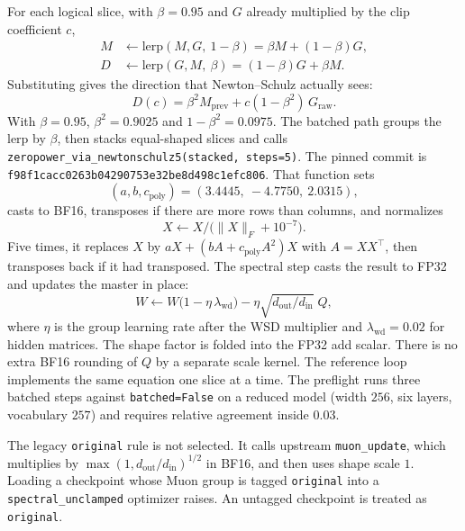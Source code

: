\documentclass[11pt]{article}
\DeclareRobustCommand{\code}[1]{\texttt{#1}}
\begin{document}
For each logical slice, with \(\beta=0.95\) and \(G\) already multiplied by
the clip coefficient \(c\),
\begin{align*}
M &\leftarrow \mathrm{lerp}(M, G,\ 1-\beta) = \beta M + (1-\beta)G,\\
D &\leftarrow \mathrm{lerp}(G, M,\ \beta) = (1-\beta)G + \beta M.
\end{align*}
Substituting gives the direction that Newton--Schulz actually sees:
\begin{equation}
\label{eq:nesterov}
D(c) = \beta^{2} M_{\mathrm{prev}} + c(1-\beta^{2})\,G_{\mathrm{raw}}.
\end{equation}
With \(\beta=0.95\), \(\beta^{2}=0.9025\) and \(1-\beta^{2}=0.0975\). The
batched path groups the lerp by \(\beta\), then stacks equal-shaped slices
and calls \code{zeropower\_via\_newtonschulz5(stacked, steps=5)}. The pinned
commit is \code{f98f1cacc0263b04290753e32be8d498c1efc806}. That function sets
\begin{equation}
(a,b,c_{\mathrm{poly}})=(3.4445,\ -4.7750,\ 2.0315),
\end{equation}
casts to BF16, transposes if there are more rows than columns, and normalizes
\begin{equation}
\label{eq:nsnorm}
X \leftarrow X / \big(\|X\|_F + 10^{-7}\big).
\end{equation}
Five times, it replaces \(X\) by \(aX + (bA+c_{\mathrm{poly}}A^{2})X\) with
\(A=XX^{\top}\), then transposes back if it had transposed. The spectral step
casts the result to FP32 and updates the master in place:
\begin{equation}
\label{eq:spectral}
W \leftarrow W\bigl(1-\eta\,\lambda_{\mathrm{wd}}\bigr)
          - \eta\sqrt{d_{\mathrm{out}}/d_{\mathrm{in}}}\; Q,
\end{equation}
where \(\eta\) is the group learning rate after the WSD multiplier and
\(\lambda_{\mathrm{wd}}=0.02\) for hidden matrices. The shape factor is
folded into the FP32 add scalar. There is no extra BF16 rounding of \(Q\) by
a separate scale kernel. The reference loop implements the same equation one
slice at a time. The preflight runs three batched steps against
\code{batched=False} on a reduced model (width \(256\), six layers,
vocabulary \(257\)) and requires relative agreement inside \(0.03\).

The legacy \code{original} rule is not selected. It calls upstream
\code{muon\_update}, which multiplies by \(\max(1,d_{\mathrm{out}}/d_{\mathrm{in}})^{1/2}\)
in BF16, and then uses shape scale \(1\). Loading a checkpoint whose Muon
group is tagged \code{original} into a \code{spectral\_unclamped} optimizer
raises. An untagged checkpoint is treated as \code{original}.
\end{document}
